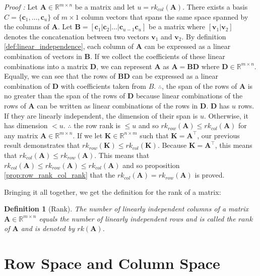 \documentclass[a4paper,12pt]{article}
\newcommand{\matrx}[1]{\bm{#1}}
\newcommand{\vectr}[1]{\textbf{#1}}
\newcommand{\real}{\mathbb{R}}
\newcommand{\italic}[1]{\textit{#1}}
\newcommand{\rrank}[1]{rk_{row}(\matrx{#1})}
\newcommand{\crank}[1]{rk_{col}(\matrx{#1})}
\newtheorem{definition}{Definition}[section]
\begin{document}
	\noindent\italic{Proof \cite{row_rank_eq_col_rank}:}
	Let $ \matrx{A} \in \real^{m \times n}$ be a matrix and let $ u = \crank{A} $. There exists a basis $ C = \{\vectr{c}_1, \ldots, \vectr{c}_u\} $ of $ m \times 1 $ column vectors that spans the same space spanned by the columns of $ \vectr{A} $. 
	Let $ \matrx{B} = [\vectr{c}_1 | \vectr{c}_2 | \ldots | \vectr{c}_{u - 1} \vectr{c}_u] $ be a matrix where $ [\vectr{v}_1 | \vectr{v}_2] $ denotes the concatenation between two vectors $ \vectr{v}_1 $ and $ \vectr{v}_2 $. By definition \ref{def:linear_independence}, each column of $ \matrx{A} $ can be expressed as a linear combination of vectors in $ \matrx{B} $. If we collect the coefficients of these linear combinations into a matrix $ \matrx{D} $, we can represent $ \matrx{A} $ as $ \matrx{A} = \matrx{BD} $ where $ \matrx{D} \in \real^{m \times n}$. Equally, we can see that the rows of $ \matrx{BD} $ can be expressed as a linear combination of $ \matrx{D} $ with coefficients taken from $ B $. $ \therefore $, the span of the rows of $ \matrx{A} $ is no greater than the span of the rows of $ \matrx{D} $ because linear combinations of the rows of $ \matrx{A} $ can be written as linear combinations of the rows in $ \matrx{D} $. $ \matrx{D} $ has $ u $ rows. If they are linearly independent, the dimension of their span is $ u $. Otherwise, it has dimension $ < u $. $ \therefore $ the row rank is $ \leq u $ and so $ \rrank{A} \leq \crank{A} $ for any matrix $ \matrx{A} \in \real^{m \times n} $. If we let $ \matrx{K} \in \real^{n \times m} $ such that $ \matrx{K} = \matrx{A}^{\top} $, our previous result demonstrates that $ \rrank{K} \leq \crank{K} $. Because $ \matrx{K} = \matrx{A}^{\top} $, this means that $ \crank{A} \leq \rrank{A} $. This means that $ \crank{A} \leq \rrank{A} \leq \crank{A} $ and so proposition \ref{prop:row_rank_col_rank} that the $ \crank{A} = \rrank{A} $ is proved. 
	
	Bringing it all together, we get the definition for the rank of a matrix:
	\begin{definition}[Rank]
		\normalfont The number of linearly independent columns of a matrix $\textbf{A} \in \mathbb{R}^{m \times n}$ equals the number of linearly independent rows and is called the $\textit{rank}$ of $\textbf{A}$ and is denoted by $rk(\textbf{A})$.
	\end{definition}
	
	\section{Row Space and Column Space}
	
\end{document}
